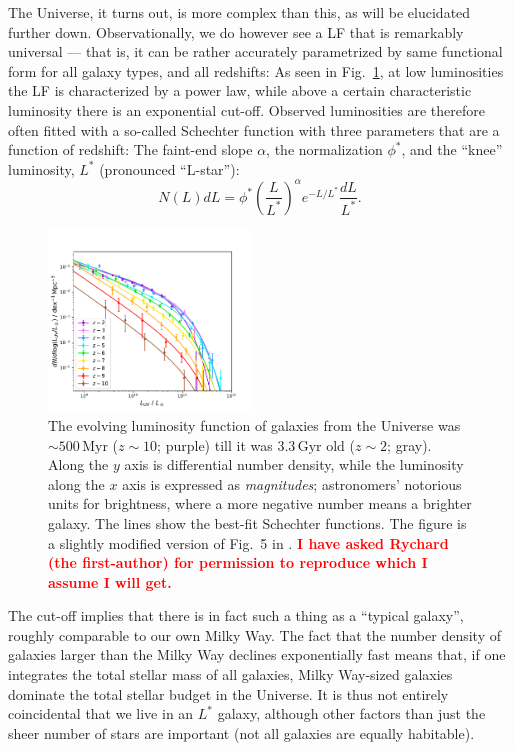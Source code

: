 \documentclass[useAMS,usenatbib,bibyear]{aa}
\newcommand{\red}[1]{\textcolor{red}{\textbf{#1}}}
\begin{document}
The Universe, it turns out, is more complex than this, as will be elucidated further down.
Observationally, we do however see a LF that is remarkably universal --- that is, it can be rather accurately parametrized by same functional form for all galaxy types, and all redshifts:
As seen in Fig.~\ref{fig:LF}, at low luminosities the LF is characterized by a power law, while above a certain characteristic luminosity there is an exponential cut-off.
Observed luminosities are therefore often fitted with a so-called Schechter function \citep{Schechter1976} with three parameters that are a function of redshift: The faint-end slope $\alpha$, the normalization $\phi^*$, and the ``knee'' luminosity, $L^*$ (pronounced ``L-star''):
\begin{equation}
    \label{eq:LF}
    N(L)dL=\phi^* \left({\frac{L}{L^*}}\right)^{\alpha} e^{-L/L^*}{\frac{dL}{L^*}}.
\end{equation}
\begin{figure}[!t]
    \centering
    \includegraphics [width=0.48\textwidth] {bouwens2021.pdf}
    \caption{The evolving luminosity function of galaxies from the Universe was $\sim500\,\mathrm{Myr}$ ($z\sim10$; purple) till it was $3.3\,\mathrm{Gyr}$ old ($z\sim2$; gray).
    Along the $y$ axis is differential number density, while the luminosity along the $x$ axis is expressed as \emph{magnitudes}; astronomers' notorious units for brightness, where a more negative number means a brighter galaxy.
    The lines show the best-fit Schechter functions.
    The figure is a slightly modified version of Fig.~5 in \citep{Bouwens2021}.
    \red{I have asked Rychard (the first-author) for permission to reproduce which I assume I will get.}
    }
    \label{fig:LF}
\end{figure}
The cut-off implies that there is in fact such a thing as a ``typical galaxy'', roughly comparable to our own Milky Way.
The fact that the number density of galaxies larger than the Milky Way declines exponentially fast means that, if one integrates the total stellar mass of all galaxies, Milky Way-sized galaxies dominate the total stellar budget in the Universe.
It is thus not entirely coincidental that we live in an $L^*$ galaxy, although other factors than just the sheer number of stars are important (not all galaxies are equally habitable).
\end{document}
